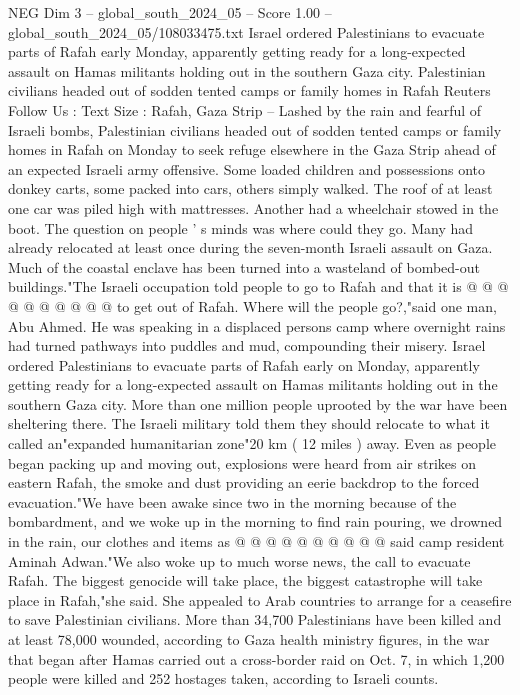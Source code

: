 \begin{textsample}{NEG Dim 3 – global\_south\_2024\_05 – Score 1.00 – global\_south\_2024\_05/108033475.txt}  \label{ex:f3_neg_358}
Israel ordered Palestinians to evacuate parts of Rafah early Monday, apparently getting ready for a long-expected assault on Hamas militants holding out in the southern Gaza city.
Palestinian civilians headed out of sodden tented camps or family homes in Rafah Reuters Follow Us : Text Size : Rafah, Gaza Strip -- Lashed by the rain and fearful of Israeli bombs, Palestinian civilians headed out of sodden tented camps or family homes in Rafah on Monday to seek refuge elsewhere in the Gaza Strip ahead of an expected Israeli army offensive.
Some loaded children and possessions onto donkey carts, some packed into cars, others simply walked.
The roof of at least one car was piled high with mattresses.
Another had a wheelchair stowed in the boot.
The question on people ' s minds was where could they go.
Many had already relocated at least once during the seven-month Israeli assault on Gaza.
Much of the coastal enclave has been turned into a wasteland of bombed-out buildings."The Israeli occupation told people to go to Rafah and that it is @ @ @ @ @ @ @ @ @ @ to get out of Rafah.
Where will the people go?,"said one man, Abu Ahmed.
He was speaking in a displaced persons camp where overnight rains had turned pathways into puddles and mud, compounding their misery.
Israel ordered Palestinians to evacuate parts of Rafah early on Monday, apparently getting ready for a long-expected assault on Hamas militants holding out in the southern Gaza city.
More than one million people uprooted by the war have been sheltering there.
The Israeli military told them they should relocate to what it called an"expanded humanitarian zone"20 km ( 12 miles ) away.
Even as people began packing up and moving out, explosions were heard from air strikes on eastern Rafah, the smoke and dust providing an eerie backdrop to the forced evacuation."We have been awake since two in the morning because of the bombardment, and we woke up in the morning to find rain pouring, we drowned in the rain, our clothes and items as @ @ @ @ @ @ @ @ @ @ said camp resident Aminah Adwan."We also woke up to much worse news, the call to evacuate Rafah.
The biggest genocide will take place, the biggest catastrophe will take place in Rafah,"she said.
She appealed to Arab countries to arrange for a ceasefire to save Palestinian civilians.
More than 34,700 Palestinians have been killed and at least 78,000 wounded, according to Gaza health ministry figures, in the war that began after Hamas carried out a cross-border raid on Oct. 7, in which 1,200 people were killed and 252 hostages taken, according to Israeli counts.

\end{textsample}
